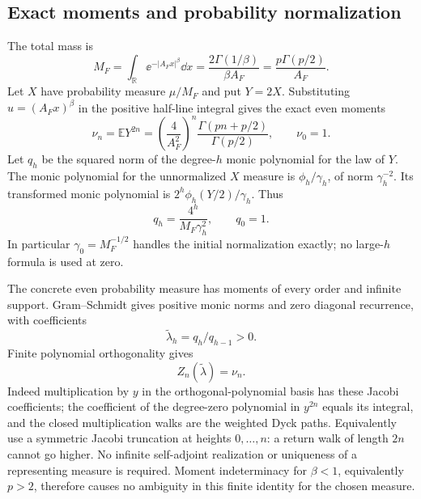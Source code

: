 \documentclass[11pt,letterpaper]{article}
\numberwithin{equation}{section}
\theoremstyle{remark}\newtheorem{remark}[theorem]{Remark}
\newcommand{\E}{\mathbb E}\newcommand{\Prob}{\mathbb P}
\begin{document}
\subsection{Exact moments and probability normalization}
The total mass is
\begin{equation}\label{pwd:hm:eq:Freud-mass}
 M_F=\int_{\mathbb R}\ee^{-|A_Fx|^\beta}\dd x
 =\frac{2\Gamma(1/\beta)}{\beta A_F}
 =\frac{p\Gamma(p/2)}{A_F}.
\end{equation}
Let $X$ have probability measure $\mu/M_F$ and put $Y=2X$. Substituting $u=(A_Fx)^\beta$ in the positive half-line integral gives the exact even moments
\begin{equation}\label{pwd:hm:eq:Freud-moments}
 \nu_n=\E Y^{2n}
 =\left(\frac4{A_F^2}\right)^n
 \frac{\Gamma(pn+p/2)}{\Gamma(p/2)},\qquad\nu_0=1.
\end{equation}
Let $q_h$ be the squared norm of the degree-$h$ monic polynomial for the law of $Y$. The monic polynomial for the unnormalized $X$ measure is $\phi_h/\gamma_h$, of norm $\gamma_h^{-2}$. Its transformed monic polynomial is $2^h\phi_h(Y/2)/\gamma_h$. Thus
\begin{equation}\label{pwd:hm:eq:Freud-norms}
 q_h=\frac{4^h}{M_F\gamma_h^2},\qquad q_0=1.
\end{equation}
In particular $\gamma_0=M_F^{-1/2}$ handles the initial normalization exactly; no large-$h$ formula is used at zero.

The concrete even probability measure has moments of every order and infinite support. Gram--Schmidt gives positive monic norms and zero diagonal recurrence, with coefficients
\begin{equation}\label{pwd:hm:eq:Freud-recurrence}
 \widetilde\lambda_h=q_h/q_{h-1}>0.
\end{equation}
Finite polynomial orthogonality gives
\begin{equation}\label{pwd:hm:eq:Freud-Dyck}
 Z_n(\widetilde\lambda)=\nu_n.
\end{equation}
Indeed multiplication by $y$ in the orthogonal-polynomial basis has these Jacobi coefficients; the coefficient of the degree-zero polynomial in $y^{2n}$ equals its integral, and the closed multiplication walks are the weighted Dyck paths. Equivalently use a symmetric Jacobi truncation at heights $0,\ldots,n$: a return walk of length $2n$ cannot go higher. No infinite self-adjoint realization or uniqueness of a representing measure is required. Moment indeterminacy for $\beta<1$, equivalently $p>2$, therefore causes no ambiguity in this finite identity for the chosen measure.
\end{document}
